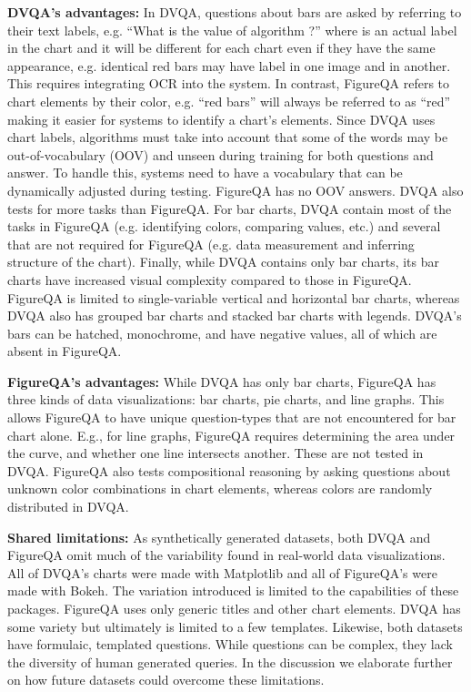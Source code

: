 \documentclass[10pt,twocolumn]{article}
\begin{document}
\textbf{DVQA's advantages:} In DVQA, questions about bars  are asked by referring to their text labels, e.g. ``What is the value of algorithm ?'' where  is an actual label in the chart and it will be different for each chart even if they have the same appearance, e.g. identical red bars may have label  in one image and  in another. This requires integrating OCR into the system. In contrast, FigureQA refers to chart elements by their color, e.g. ``red bars'' will always be referred to as ``red'' making it easier for systems to identify a chart's elements. Since DVQA uses chart labels, algorithms must take into account that some of the words may be out-of-vocabulary (OOV) and unseen during training for both questions and answer. To handle this, systems need to have a vocabulary that can be dynamically adjusted during testing. FigureQA has no OOV answers. DVQA also tests for more tasks than FigureQA. For bar charts, DVQA contain most of the tasks in FigureQA (e.g. identifying colors, comparing values, etc.) and several that are not required for FigureQA (e.g. data measurement and inferring structure of the chart). Finally, while DVQA contains only bar charts, its bar charts have increased visual complexity compared to those in FigureQA. FigureQA is limited to single-variable vertical and horizontal bar charts, whereas DVQA also has grouped bar charts and stacked bar charts with legends. DVQA's bars can be hatched, monochrome, and have negative values, all of which are absent in FigureQA.

\textbf{FigureQA's advantages:} While DVQA has only bar charts, FigureQA has three kinds of data visualizations: bar charts, pie charts, and line graphs. This allows FigureQA to have unique question-types that are not encountered for bar chart alone. E.g., for line graphs, FigureQA requires determining the area under the curve, and whether one line intersects another. These are not tested in DVQA. FigureQA also tests compositional reasoning by asking questions about unknown color combinations in chart elements, whereas colors are randomly distributed in DVQA.


\textbf{Shared limitations:} As synthetically generated datasets, both DVQA and FigureQA omit much of the variability found in real-world data visualizations. All of DVQA's charts were made with Matplotlib  and all of FigureQA's were made with Bokeh. The variation introduced is limited to the capabilities of these packages. FigureQA uses only generic titles and other chart elements. DVQA has some variety but ultimately is limited to a few templates. Likewise, both datasets have formulaic, templated questions. While questions can be complex, they lack the diversity of human generated queries. In the discussion we elaborate further on how future datasets could overcome these limitations. 
\end{document}
